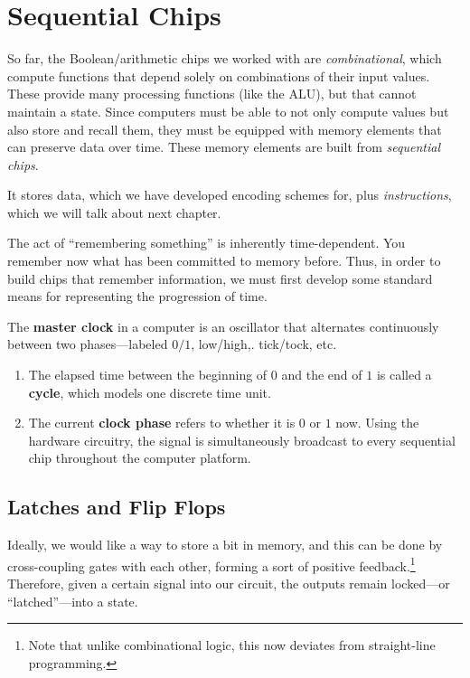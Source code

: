 \section{Sequential Chips}

  So far, the Boolean/arithmetic chips we worked with are \textit{combinational}, which compute functions that depend solely on combinations of their input values.  These provide many processing functions (like the ALU), but that cannot maintain a state. Since computers must be able to not only compute values but also store and recall them, they must be equipped with memory elements that can preserve data over time. These memory elements are built from \textit{sequential chips}. 

  It stores data, which we have developed encoding schemes for, plus \textit{instructions}, which we will talk about next chapter. 

  The act of ``remembering something'' is inherently time-dependent. You remember now what has been committed to memory before. Thus, in order to build chips that remember information, we must first develop some standard means for representing the progression of time. 

  \begin{definition}[Clock] 
    The \textbf{master clock} in a computer is an oscillator that alternates continuously between two phases---labeled $0/1$, low/high,. tick/tock, etc. 
    \begin{enumerate}
      \item The elapsed time between the beginning of $0$ and the end of $1$ is called a \textbf{cycle}, which models one discrete time unit. 
      \item The current \textbf{clock phase} refers to whether it is $0$ or $1$ now. Using the hardware circuitry, the signal is simultaneously broadcast to every sequential chip throughout the computer platform. 
    \end{enumerate}
  \end{definition}

\subsection{Latches and Flip Flops}

  Ideally, we would like a way to store a bit in memory, and this can be done by cross-coupling gates with each other, forming a sort of positive feedback.\footnote{Note that unlike combinational logic, this now deviates from straight-line programming.} Therefore, given a certain signal into our circuit, the outputs remain locked---or ``latched''---into a state. 

